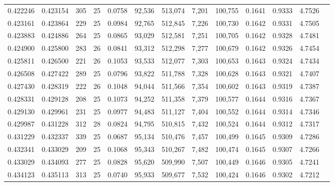 \begin{tabular}{rrrrrrrrrrrrr}
0.422246 & 0.423154 &   305 &  25 &                                     0.0758 &  92,536 & 513,074 &   7,201 & 100,755 & 0.1641 & 0.9333 & 4.7526 \\
0.423161 & 0.423864 &   229 &  25 &                                     0.0984 &  92,765 & 512,845 &   7,226 & 100,730 & 0.1642 & 0.9331 & 4.7505 \\
0.423883 & 0.424886 &   264 &  25 &                                     0.0865 &  93,029 & 512,581 &   7,251 & 100,705 & 0.1642 & 0.9328 & 4.7481 \\
0.424900 & 0.425800 &   283 &  26 &                                     0.0841 &  93,312 & 512,298 &   7,277 & 100,679 & 0.1642 & 0.9326 & 4.7454 \\
0.425811 & 0.426500 &   221 &  26 &                                     0.1053 &  93,533 & 512,077 &   7,303 & 100,653 & 0.1643 & 0.9324 & 4.7434 \\
0.426508 & 0.427422 &   289 &  25 &                                     0.0796 &  93,822 & 511,788 &   7,328 & 100,628 & 0.1643 & 0.9321 & 4.7407 \\
0.427430 & 0.428319 &   222 &  26 &                                     0.1048 &  94,044 & 511,566 &   7,354 & 100,602 & 0.1643 & 0.9319 & 4.7387 \\
0.428331 & 0.429128 &   208 &  25 &                                     0.1073 &  94,252 & 511,358 &   7,379 & 100,577 & 0.1644 & 0.9316 & 4.7367 \\
0.429130 & 0.429961 &   231 &  25 &                                     0.0977 &  94,483 & 511,127 &   7,404 & 100,552 & 0.1644 & 0.9314 & 4.7346 \\
0.429987 & 0.431228 &   312 &  28 &                                     0.0824 &  94,795 & 510,815 &   7,432 & 100,524 & 0.1644 & 0.9312 & 4.7317 \\
0.431229 & 0.432337 &   339 &  25 &                                     0.0687 &  95,134 & 510,476 &   7,457 & 100,499 & 0.1645 & 0.9309 & 4.7286 \\
0.432341 & 0.433029 &   209 &  25 &                                     0.1068 &  95,343 & 510,267 &   7,482 & 100,474 & 0.1645 & 0.9307 & 4.7266 \\
0.433029 & 0.434093 &   277 &  25 &                                     0.0828 &  95,620 & 509,990 &   7,507 & 100,449 & 0.1646 & 0.9305 & 4.7241 \\
0.434123 & 0.435113 &   313 &  25 &                                     0.0740 &  95,933 & 509,677 &   7,532 & 100,424 & 0.1646 & 0.9302 & 4.7212 \\

\end{tabular}
